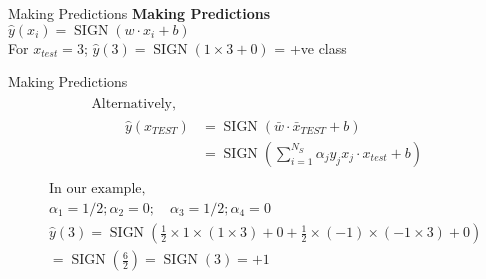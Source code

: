 \documentclass{beamer}
\begin{document}
\begin{frame}{Making Predictions}
\textbf{Making Predictions} \\
\hspace{2cm} $\hat{y}(x_i) = \operatorname{SIGN}(w \cdot x_i + b)$\\

For $x_{test} = 3$; $\hat{y}(3) = \operatorname{SIGN}(1 \times 3 + 0)$ = +ve class
\end{frame}

\begin{frame}{Making Predictions}\
\begin{align*}
\begin{array}{l}
{\text {Alternatively, }} \\
{\qquad \begin{aligned}
\hat{y}\left(x_{TEST}\right) &=\operatorname{SIGN}\left(\bar{w} \cdot \bar{x}_{TEST}+b\right) \\
&=\operatorname{SIGN} \left(\sum_{i=1}^{N_{S}} \alpha_{j} y_{j} x_{j} \cdot x_{test}+b\right)
\end{aligned}}
\end{array}
\end{align*}
\begin{align*}
\begin{aligned}
&\text{In our example,} \\
&\alpha_{1}=1/2 ; \alpha_{2}=0 ; \quad \alpha_{3}=1/2 ; \alpha_{4}=0\\
&\hat{y}(3) =\operatorname{SIGN}\left(\frac{1}{2} \times 1 \times (1 \times 3)+0+\frac{1}{2} \times (-1) \times (-1 \times 3)+0\right)\\
&=\operatorname{SIGN} \left(\frac{6}{2}\right)=\operatorname{SIGN}(3)=+1
\end{aligned}
\end{align*}

\end{frame}
\end{document}
